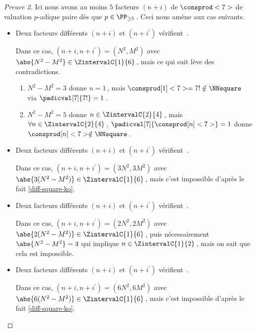 \begin{proof}[Preuve 2]%
    Ici nous avons au moins $5$ facteurs $(n + i)$ de $\consprod<7>$ de valuation $p$-adique paire dès que $p \in \PP_{\geq 5}$\,.
    Ceci nous amène aux cas suivants.
    \begin{itemize}
    	\medskip
		\item Deux facteurs différents $(n+i)$ et $(n+i^\prime)$ vérifient \,.
		
		\smallskip
		\noindent
		Dans ce cas, $(n+i, n+i^\prime) = (N^2, M^2)$ avec $\abs{N^2 - M^2} \in \ZintervalC{1}{6}$\,, mais ce qui suit lève des contradictions.
		\begin{enumerate}
			\item $N^2 - M^2 = 3$ donne $n = 1$\,, mais $\consprod[1]<7> = 7! \notin \NNsquare$ via $\padicval[7]{7!} = 1$\,.


			\item $N^2 - M^2 = 5$ donne $n \in \ZintervalC{2}{4}$\,, mais $\forall n \in \ZintervalC{2}{4}$\,, $\padicval[7]{\consprod[n]<7>} = 1$ donne $\consprod[n]<7> \notin \NNsquare$\,.
		\end{enumerate}


    	\medskip
		\item Deux facteurs différents $(n+i)$ et $(n+i^\prime)$ vérifient \,.
		
		\smallskip
		\noindent
		Dans ce cas, $(n+i, n+i^\prime) = (3 N^2, 3 M^2)$ avec $\abs{3(N^2 - M^2)} \in \ZintervalC{1}{6}$\,, mais c'est impossible d'après le fait \ref{diff-square-ko}.

    	\medskip
		\item Deux facteurs différents $(n+i)$ et $(n+i^\prime)$ vérifient \,.
		
		\smallskip
		\noindent
		Dans ce cas, $(n+i, n+i^\prime) = (2 N^2, 2 M^2)$ avec $\abs{2(N^2 - M^2)} \in \ZintervalC{1}{6}$\,, puis nécessairement $\abs{N^2 - M^2} = 3$ qui implique $n \in \ZintervalC{1}{2}$\,, mais on sait que cela est impossible.


    	\medskip
		\item Deux facteurs différents $(n+i)$ et $(n+i^\prime)$ vérifient \,.
		
		\smallskip
		\noindent
		Dans ce cas, $(n+i, n+i^\prime) = (6 N^2, 6 M^2)$ avec $\abs{6(N^2 - M^2)} \in \ZintervalC{1}{6}$\,, mais c'est impossible d'après le fait \ref{diff-square-ko}.
		\qedhere
    \end{itemize}
\end{proof}

 